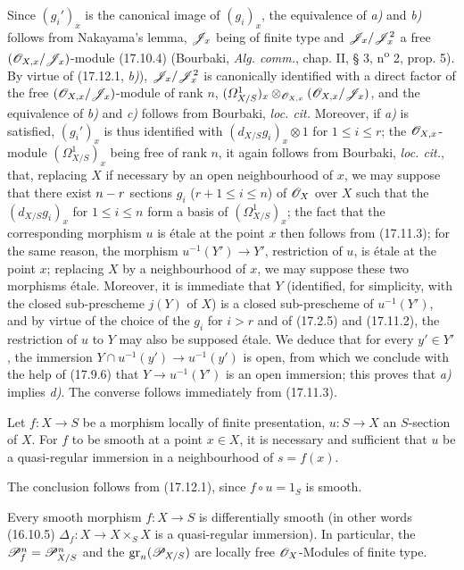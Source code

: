 Since $(g_i')_x$ is the canonical image of $(g_i)_x$, the equivalence of \emph{a)} and \emph{b)} follows from Nakayama's lemma, $\mathscr{J}_x$ being of finite type and $\mathscr{J}_x/\mathscr{J}_x^2$ a free $(\mathscr{O}_{X,x}/\mathscr{J}_x)$-module (17.10.4) (Bourbaki, \emph{Alg. comm.}, chap. II, § 3, n\textsuperscript{o} 2, prop. 5). By virtue of (17.12.1, \emph{b)}), $\mathscr{J}_x/\mathscr{J}_x^2$ is canonically identified with a direct factor of the free $(\mathscr{O}_{X,x}/\mathscr{J}_x)$-module of rank $n$, $(\varOmega^1_{X/S})_x\otimes_{\mathscr{O}_{X,x}}(\mathscr{O}_{X,x}/\mathscr{J}_x)$, and the equivalence of \emph{b)} and \emph{c)} follows from Bourbaki, \emph{loc. cit.} Moreover, if \emph{a)} is satisfied, $(g_i')_x$ is thus identified with $(d_{X/S}g_i)_x\otimes1$ for $1\leq i\leq r$; the $\mathscr{O}_{X,x}$-module $(\varOmega^1_{X/S})_x$ being free of rank $n$, it again follows from Bourbaki, \emph{loc. cit.}, that, replacing $X$ if necessary by an open neighbourhood of $x$, we may suppose that there exist $n- r$ sections $g_i$ ($r+1\leq i\leq n$) of $\mathscr{O}_X$ over $X$ such that the $(d_{X/S}g_i)_x$ for $1\leq i\leq n$ form a basis of $(\varOmega^1_{X/S})_x$; the fact that the corresponding morphism $u$ is étale at the point $x$ then follows from (17.11.3); for the same reason, the morphism $u^{-1}(Y')\to Y'$, restriction of $u$, is étale at the point $x$; replacing $X$ by a neighbourhood of $x$, we may suppose these two morphisms étale. Moreover, it is immediate that $Y$ (identified, for simplicity, with the closed sub-prescheme $j(Y)$ of $X$) is a closed sub-prescheme of $u^{-1}(Y')$, and by virtue of the choice of the $g_i$ for $i>r$ and of (17.2.5) and (17.11.2), the restriction of $u$ to $Y$ may also be supposed étale. We deduce that for every $y'\in Y'$, the immersion $Y\cap u^{-1}(y')\to u^{-1}(y')$ is open, from which we conclude with the help of (17.9.6) that $Y\to u^{-1}(Y')$ is an open immersion; this proves that \emph{a)} implies \emph{d)}. The converse follows immediately from (17.11.3).

\begin{corollary}[17.12.3]
\label{IV.17.12.3}
Let $f:X\to S$ be a morphism locally of finite presentation, $u:S\to X$ an $S$-section of $X$. For $f$ to be smooth at a point $x\in X$, it is necessary and sufficient that $u$ be a quasi-regular immersion in a neighbourhood of $s=f(x)$.
\end{corollary}

The conclusion follows from (17.12.1), since $f\circ u=1_S$ is smooth.

\begin{proposition}[17.12.4]
\label{IV.17.12.4}
Every smooth morphism $f:X\to S$ is differentially smooth \textup{(in other words (16.10.5) $\Delta_f:X\to X\times_SX$ is a quasi-regular immersion)}. In particular, the $\mathscr{P}_f^n=\mathscr{P}_{X/S}^n$ and the $\operatorname{gr}_n(\mathscr{P}_{X/S})$ are locally free $\mathscr{O}_X$-Modules of finite type.
\end{proposition}

